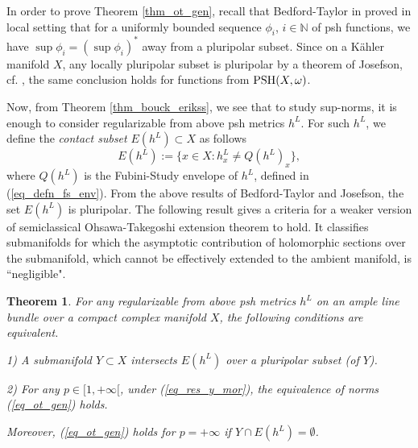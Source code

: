 \documentclass[12pt]{article}
\numberwithin{equation}{section}
\theoremstyle{theorem}
\newtheorem{thm}{Theorem}[section]
\theoremstyle{definition}
\theoremstyle{remark}
\newcommand{\nat}{\mathbb{N}}
\begin{document}
	\par 
	In order to prove Theorem \ref{thm_ot_gen}, recall that Bedford-Taylor in \cite[Theorem 7.1]{BedfordTaylor} proved in local setting that for a uniformly bounded sequence $\phi_i$, $i \in \nat$ of psh functions, we have $\sup \phi_i = (\sup \phi_i)^*$ away from a pluripolar subset.
	Since on a Kähler manifold $X$, any locally pluripolar subset is pluripolar by a theorem of Josefson, cf. \cite[Theorem 7.2]{GuedZeriGeomAnal}, the same conclusion holds for functions from ${\rm{PSH}}(X, \omega)$.
	\par 
	Now, from Theorem \ref{thm_bouck_erikss}, we see that to study sup-norms, it is enough to consider regularizable from above psh metrics $h^L$.
	For such $h^L$, we define the \textit{contact subset} $E(h^L) \subset X$ as follows
	\begin{equation}\label{eq_e_sub_defn}
		E(h^L) := \big\{ x \in X : h^L_x \neq Q(h^L)_x \big\},
	\end{equation}	 
	where $Q(h^L)$ is the Fubini-Study envelope of $h^L$, defined in (\ref{eq_defn_fs_env}).
	From the above results of Bedford-Taylor and Josefson, the set $E(h^L)$ is pluripolar.
	The following result gives a criteria for a weaker version of semiclassical Ohsawa-Takegoshi extension theorem to hold.
	It classifies submanifolds for which the asymptotic contribution of holomorphic sections over the submanifold, which cannot be effectively extended to the ambient manifold, is “negligible".
	\begin{thm}\label{thm_ot_weak}
		For any regularizable from above psh metrics $h^L$ on an ample line bundle over a compact complex manifold $X$, the following conditions are equivalent.
		\par 
		1) A submanifold $Y \subset X$ intersects $E(h^L)$ over a pluripolar subset (of $Y$).
		\par 
		2) For any $p \in [1, +\infty[$, under (\ref{eq_res_y_mor}), the equivalence of norms (\ref{eq_ot_gen}) holds.
		\par 
		Moreover, (\ref{eq_ot_gen}) holds for $p = + \infty$ if $Y \cap E(h^L) = \emptyset$.
	\end{thm}
\end{document}
